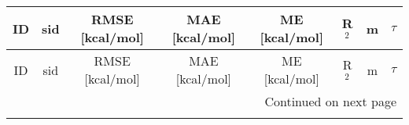 \documentclass[8pt]{article}
\begin{document}
\begin{center}
\begin{footnotesize}
\begin{longtable}{|cccccccc|}
\toprule
                                                ID & sid &   RMSE [kcal/mol] &    MAE [kcal/mol] &       ME [kcal/mol] &             R$^2$ &                  m &             $\tau$ \\
\midrule
\endfirsthead

\toprule
                                                ID & sid &   RMSE [kcal/mol] &    MAE [kcal/mol] &       ME [kcal/mol] &             R$^2$ &                  m &             $\tau$ \\
\midrule
\endhead
\midrule
\multicolumn{8}{r}{{Continued on next page}} \\
\midrule
\endfoot


\end{longtable}
\end{footnotesize}
\end{center}
\end{document}
